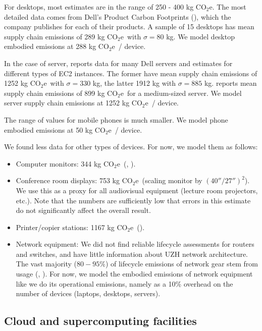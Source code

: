 \documentclass[11pt]{article}
\newcommand{\coe}{CO$_2$e}
\newcommand{\gcoe}{g \coe}
\newcommand{\kgcoe}{k\gcoe}
\begin{document}
For desktops, most estimates are in the range of 250 - 400 \kgcoe. The most detailed data comes from Dell's Product Carbon Footprints (\cite{dellpcf}), which the company publishes for each of their products. A sample of 15 desktops has mean supply chain emissions of 289 \kgcoe\ with $\sigma = 80$ kg. We model desktop embodied emissions at 288 \kgcoe\ / device.

In the case of server, \textcite{davy2021} reports data for many Dell servers and estimates for different types of EC2 instances. The former have mean supply chain emissions of 1252 \kgcoe\ with $\sigma = 330$ kg, the latter 1912 kg with $\sigma = 885$ kg. \textcite{boavizta} reports mean supply chain emissions of 899 \kgcoe\ for a medium-sized server. We model server supply chain emissions at 1252 \kgcoe\ / device.

The range of values for mobile phones is much smaller. We model phone embodied emissions at 50 \kgcoe\ / device.

We found less data for other types of devices. For now, we model them as follows:

\begin{itemize}
    \item Computer monitors: 344 \kgcoe\ (\cite{teehan2013}, \cite{dellpcf}).
    \item Conference room displays: 753 \kgcoe\ (scaling monitor by $(40''/27'')^2$). We use this as a proxy for all audiovisual equipment (lecture room projectors, etc.). Note that the numbers are sufficiently low that errors in this estimate do not significantly affect the overall result.
    \item Printer/copier stations: 1167 \kgcoe\ (\cite{ecoinvent}).
    \item Network equipment: We did not find reliable lifecycle assessments for routers and switches,
      and have little information about UZH network architecture. The vast majority ($80-95\%$) of
      lifecycle emissions of network gear stem from usage (\cite{cisco2024}, \cite{jacob2023}).
      For now, we model the embodied emissions of network equipment like we do its operational emissions, namely as a 10\% overhead on the number of devices (laptops, desktops, servers).
\end{itemize}

\subsection{Cloud and supercomputing facilities}
\end{document}
